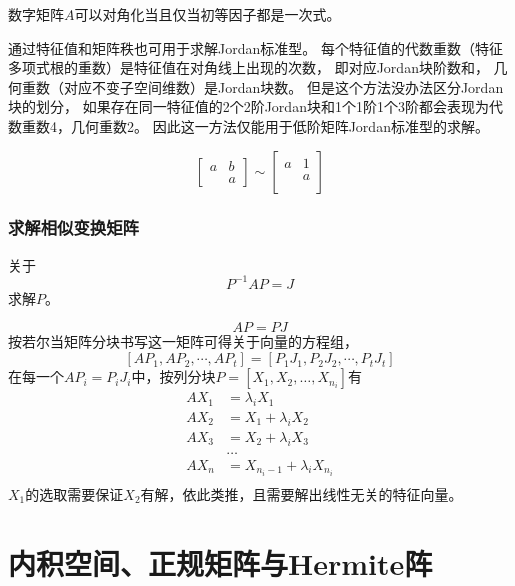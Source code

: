 \begin{corollary}
    数字矩阵$A$可以对角化当且仅当初等因子都是一次式。
\end{corollary}

通过特征值和矩阵秩也可用于求解Jordan标准型。
每个特征值的代数重数（特征多项式根的重数）是特征值在对角线上出现的次数，
即对应Jordan块阶数和，
几何重数（对应不变子空间维数）是Jordan块数。
但是这个方法没办法区分Jordan块的划分，
如果存在同一特征值的2个2阶Jordan块和1个1阶1个3阶都会表现为代数重数4，几何重数2。
因此这一方法仅能用于低阶矩阵Jordan标准型的求解。

\begin{theorem}
    \[
        \begin{bmatrix}
            a & b\\
              & a
        \end{bmatrix}
        \sim
        \begin{bmatrix}
            a & 1 \\
              & a \\
        \end{bmatrix}
    \]
\end{theorem}

\subsubsection{求解相似变换矩阵}
关于
\[
    P^{-1}AP=J
\]
求解$P$。

\[
    AP=PJ
\]
按若尔当矩阵分块书写这一矩阵可得关于向量的方程组，
\[
    \left[A P_{1}, A P_{2}, \cdots, A P_{t}\right]=\left[P_{1} J_{1}, P_{2} J_{2}, \cdots, P_{t} J_{t}\right]
\]
在每一个$A P_i = P_i J_i$中，按列分块$P=[X_1,X_2,\dots,X_{n_i}]$有
\[
    \begin{split}
        A X_1 &= \lambda_i X_1 \\
        A X_2 &= X_1+ \lambda_i X_2\\
        A X_3 &= X_2+ \lambda_i X_3 \\
        &\dots \\
        A X_n &= X_{n_i-1}+\lambda_i X_{n_i}\\
    \end{split}
\]
$X_1$的选取需要保证$X_2$有解，依此类推，且需要解出线性无关的特征向量。

\section{内积空间、正规矩阵与Hermite阵}

